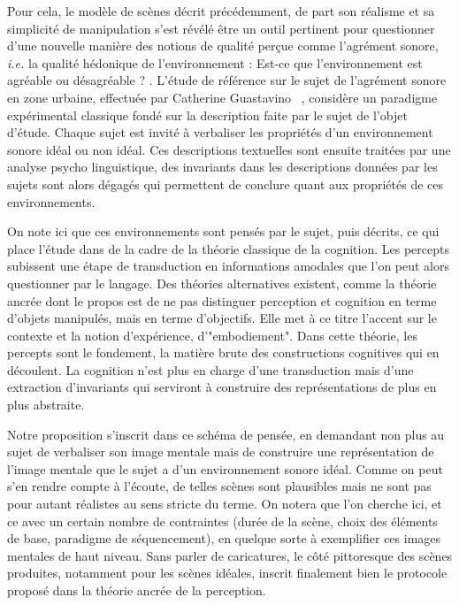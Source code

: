 Pour cela, le modèle de scènes décrit précédemment, de part son réalisme et sa simplicité de manipulation s'est révélé être un outil pertinent pour questionner d'une nouvelle manière des notions de qualité perçue comme l'agrément sonore, \textit{i.e.} la qualité hédonique de l’environnement : \og Est-ce que l’environnement est agréable ou désagréable ? \fg. L'étude de référence sur le sujet de l'agrément sonore en zone urbaine, effectuée par Catherine Guastavino ~\cite{guastavino2006ideal}, considère un paradigme expérimental classique fondé sur la description faite par le sujet de l'objet d'étude. Chaque sujet est invité à verbaliser les propriétés d'un environnement sonore idéal ou non idéal. Ces descriptions textuelles sont ensuite traitées par une analyse psycho linguistique, des invariants dans les descriptions données par les sujets sont alors dégagés qui permettent de conclure quant aux propriétés de ces environnements.

On note ici que ces environnements sont pensés par le sujet, puis décrits, ce qui place l'étude dans de la cadre de la théorie classique de la cognition. Les percepts subissent une étape de transduction en informations amodales que l'on peut alors questionner par le langage. Des théories alternatives existent, comme la théorie ancrée\cite{barsalou2010grounded} dont le propos est de ne pas distinguer perception et cognition en terme d'objets manipulés, mais en terme d'objectifs. Elle met à ce titre l'accent sur le contexte et la notion d'expérience, d'"embodiement". Dans cette théorie, les percepts sont le fondement, la matière brute des constructions cognitives qui en découlent. La cognition n'est plus en charge d'une transduction mais d'une extraction d'invariants qui serviront à construire des représentations de plus en plus abstraite.

Notre proposition s'inscrit dans ce schéma de pensée, en demandant non plus au sujet de verbaliser son image mentale mais de \og construire \fg une représentation de l'image mentale que le sujet a d'un environnement sonore idéal. Comme on peut s'en rendre compte à l'écoute, de telles scènes sont plausibles mais ne sont pas pour autant réalistes au sens stricte du terme. On notera que l'on cherche ici, et ce avec un certain nombre de contraintes (durée de la scène, choix des éléments de base, paradigme de séquencement), en quelque sorte à exemplifier ces images mentales de haut niveau. Sans parler de caricatures, le côté pittoresque des scènes produites, notamment pour les scènes idéales, inscrit finalement bien le protocole proposé dans la théorie ancrée de la perception.

